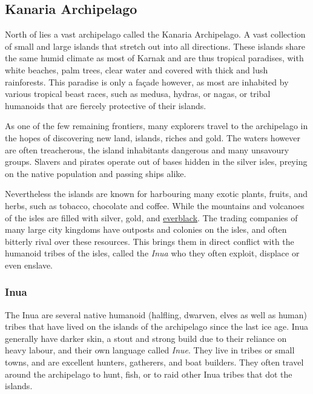 \subsection{Kanaria Archipelago}
\label{sec:Kanaria Archipelago}

North of  lies a vast archipelago called the Kanaria
Archipelago. A vast collection of small and large islands that stretch out
into all directions. These islands share the same humid climate as most of
Karnak and are thus tropical paradises, with white beaches, palm trees, clear
water and covered with thick and lush rainforests. This paradise is only a
façade however, as most are inhabited by various tropical beast races, such as
medusa, hydras, or nagas, or tribal humanoids that are fiercely protective of
their islands.

As one of the few remaining frontiers, many explorers travel to the archipelago
in the hopes of discovering new land, islands, riches and gold. The waters
however are often treacherous, the island inhabitants dangerous and many
unsavoury groups. Slavers and pirates operate out of bases hidden in the
silver isles, preying on the native population and passing ships alike.

Nevertheless the islands are known for harbouring many exotic plants, fruits,
and herbs, such as tobacco, chocolate and coffee. While the mountains and
volcanoes of the isles are filled with silver, gold, and
\hyperref[sec:Everblack]{everblack}. The trading companies of many large city
kingdoms have outposts and colonies on the isles, and often bitterly rival
over these resources. This brings them in direct conflict with the humanoid
tribes of the isles, called the \emph{Inua} who they often exploit, displace
or even enslave.

\subsubsection{Inua}
\label{sec:Inua}

The Inua are several native humanoid (halfling, dwarven, elves as well as
human) tribes that have lived on the islands of the archipelago since the last
ice age. Inua generally have darker skin, a stout and strong build due to their
reliance on heavy labour, and their own language called \emph{Inue}. They live
in tribes or small towns, and are excellent hunters, gatherers, and boat
builders. They often travel around the archipelago to hunt, fish, or to raid
other Inua tribes that dot the islands.

